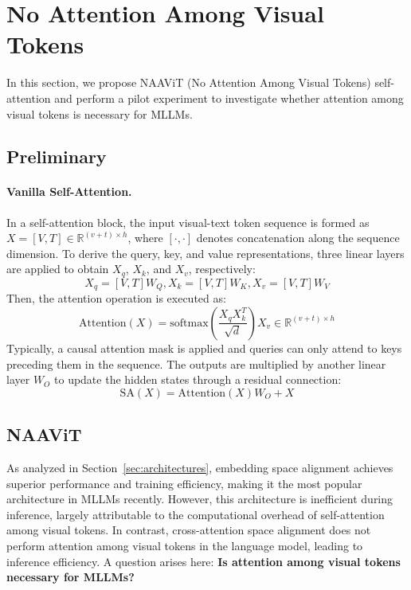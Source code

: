 \section{No Attention Among Visual Tokens}
\label{sec:rethinking}
In this section, we propose NAAViT (No Attention Among Visual Tokens) self-attention and perform a pilot experiment to investigate whether attention among visual tokens is necessary for MLLMs.
\subsection{Preliminary}
\paragraph{Vanilla Self-Attention.}
In a self-attention block, the input visual-text token sequence is formed as $X=[V,T]\in \mathbb{R}^{(v+t) \times h}$,
where $[\cdot,\cdot]$ denotes concatenation along the sequence dimension. To derive the query, key, and value representations, three linear layers are applied to obtain $X_q$,  $X_k$, and  $X_v$, respectively:
\begin{equation}
X_q=[V,T]W_Q, X_k=[V,T]W_K, X_v=[V,T]W_V
\end{equation}
Then, the attention operation is executed as:
\begin{equation}
\text{Attention}(X) = \text{softmax}\left(\frac{X_q X_k^T}{\sqrt{d}}\right) X_v\in \mathbb{R}^{(v+t) \times h}
\label{eq:attention}
\end{equation}
Typically, a causal attention mask is applied and queries can only attend to keys preceding them in the sequence.
The outputs are multiplied by another linear layer $W_O$ to update the hidden states through a residual connection:
\begin{equation}
\text{SA}(X) = \text{Attention}(X)W_O+X
\label{eq:2}
\end{equation}

\subsection{NAAViT}
As analyzed in Section~\ref{sec:architectures}, embedding space alignment achieves superior performance and training efficiency, making it the most popular architecture in MLLMs recently.
However, this architecture is inefficient during inference, largely attributable to the computational overhead of self-attention among visual tokens. In contrast, cross-attention space alignment does not perform attention among visual tokens in the language model, leading to inference efficiency.
A question arises here: \textbf{Is attention among visual tokens necessary for MLLMs?}

